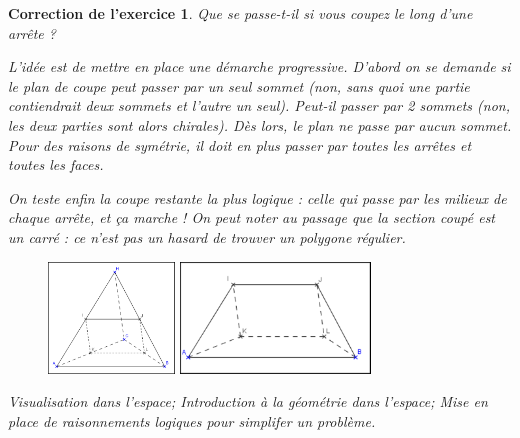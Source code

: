 \documentclass[12pt]{article}
\theoremstyle{break}
\newtheorem{cor}{Correction de l'exercice}
\begin{document}
\begin{cor}
\textit{Que se passe-t-il si vous coupez le long d'une arrête ?}

L'idée est de mettre en place une démarche progressive. D'abord on se demande si le plan de coupe peut passer par un seul sommet (non, sans quoi une partie contiendrait deux sommets et l'autre un seul). Peut-il passer par 2 sommets (non, les deux parties sont alors chirales). Dès lors, le plan ne passe par aucun sommet. Pour des raisons de symétrie, il doit en plus passer par toutes les arrêtes et toutes les faces.

On teste enfin la coupe restante la plus logique : celle qui passe par les milieux de chaque arrête, et ça marche ! On peut noter au passage que la section coupé est un carré : ce n'est pas un hasard de trouver un polygone régulier.

\begin{figure}[h!]
	\centering
    \includegraphics[width=0.3\textwidth]{images/CoupeTetraedreAvecSolution.png}
    \includegraphics[width=0.45\textwidth]{images/CoupeTetraedreAvecSolution2.png}
\end{figure}

\textit{Visualisation dans l'espace; Introduction à la géométrie dans l'espace; Mise en place de raisonnements logiques pour simplifer un problème.}

\end{cor}
\end{document}
